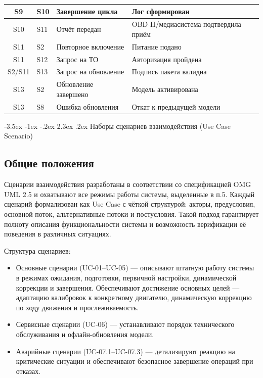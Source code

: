 \documentclass[14pt, a4paper]{extarticle}
\makeatletter
\renewcommand\section{\clearpage\@startsection{section}{1}{1.25cm}%
	{-3.5ex \@plus -1ex \@minus -.2ex}%
	{2.3ex \@plus.2ex}%
	{%
		\bfseries
		\fontsize{16}{1.5}\selectfont
}}
\makeatother
\begin{document}
{\begin{xltabular}{\textwidth}{|c|L|L|L|}
						\hline
						S9 & S10 & Завершение цикла & Лог сформирован \\
						\hline
						S10 & S11 & Отчёт передан & OBD-II/медиасистема подтвердила приём \\
						\hline
						S11 & S2 & Повторное включение & Питание подано \\
						\hline
						S11 & S12 & Запрос на ТО & Авторизация пройдена \\
						\hline
						S2/S11 & S13 & Запрос на обновление & Подпись пакета валидна \\
						\hline
						S13 & S2 & Обновление завершено & Модель активирована \\
						\hline
						S13 & S8 & Ошибка обновления & Откат к предыдущей модели \\
						\hline
					\end{xltabular}}
					
			\section{Наборы сценариев взаимодействия (Use Case Scenario)}
			
				\subsection{Общие положения}
				
					Сценарии взаимодействия разработаны в соответствии со спецификацией OMG UML 2.5 и охватывают все режимы работы системы, выделенные в п.5. Каждый сценарий формализован как Use Case с чёткой структурой: акторы, предусловия, основной поток, альтернативные потоки и постусловия. Такой подход гарантирует полноту описания функциональности системы и возможность верификации её поведения в различных ситуациях.
					
					Структура сценариев:
					\begin{itemize}
						\item Основные сценарии (UC-01–UC-05) — описывают штатную работу системы в режимах ожидания, подготовки, первичной настройки, динамической коррекции и завершения. Обеспечивают достижение основных целей — адаптацию калибровок к конкретному двигателю, динамическую коррекцию по ходу движения и прослеживаемость.
						\item Сервисные сценарии (UC-06) — устанавливают порядок технического обслуживания и офлайн-обновления модели.
						\item Аварийные сценарии (UC-07.1–UC-07.3) — детализируют реакцию на критические ситуации и обеспечивают безопасное завершение операций при отказах.
					\end{itemize}
					
\end{document}
